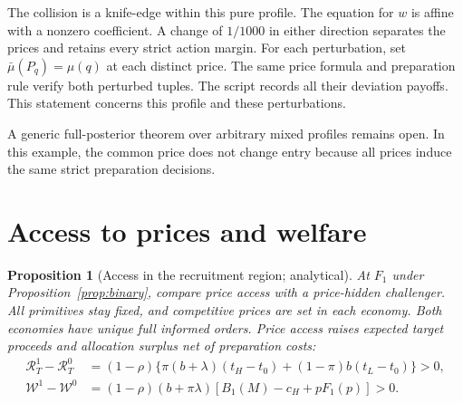 \documentclass[12pt]{article}
\newtheorem{proposition}{Proposition}
\newcommand{\RR}{\mathcal R_T}
\newcommand{\WW}{\mathcal W}
\begin{document}
The collision is a knife-edge within this pure profile.
The equation for $w$ is affine with a nonzero coefficient.
A change of $1/1000$ in either direction separates the prices and retains every strict action margin.
For each perturbation, set $\bar\mu(P_q)=\mu(q)$ at each distinct price.
The same price formula and preparation rule verify both perturbed tuples.
The script records all their deviation payoffs.
This statement concerns this profile and these perturbations.

A generic full-posterior theorem over arbitrary mixed profiles remains open.
In this example, the common price does not change entry because all prices induce the same strict preparation decisions.

\section{Access to prices and welfare}\label{sec:access}

\begin{proposition}[Access in the recruitment region; analytical]\label{prop:access}
At $F_1$ under Proposition~\ref{prop:binary}, compare price access with a price-hidden challenger.
All primitives stay fixed, and competitive prices are set in each economy.
Both economies have unique full informed orders.
Price access raises expected target proceeds and allocation surplus net of preparation costs:
\begin{align}\label{eq:access}
 \RR^1-\RR^0
 &=(1-\rho)\{\pi(b+\lambda)(t_H-t_0)+(1-\pi)b(t_L-t_0)\}>0,\\
 \WW^1-\WW^0
 &=(1-\rho)(b+\pi\lambda)[B_1(M)-c_H+pF_1(p)]>0.\nonumber
\end{align}
\end{proposition}
\end{document}
